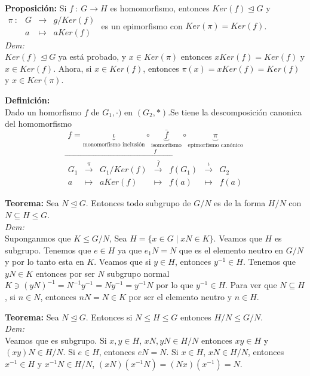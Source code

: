 \documentclass{article}
\begin{document}
\textbf{Proposición:} Si $f\::\:G\longrightarrow H$ es homomorfismo, entonces $Ker(f)\trianglelefteq G$ y $
\begin{array}{cccc}
    \pi\::&G&\longrightarrow&g/Ker(f)\\
        &a&\longmapsto&aKer(f)
\end{array}
$ es un epimorfismo con $Ker(\pi)=Ker(f)$.\\
\textit{Dem:}\\
$Ker(f)\trianglelefteq G$ ya está probado, y $x\in Ker(\pi)$ entonces $xKer(f)=Ker(f)$ y $x\in Ker(f)$. Ahora, si $x\in Ker(f)$, entonces $\pi(x)=xKer(f)=Ker(f)$ y $x \in Ker(\pi)$.

\textbf{Definición:}\\
Dado un homorfismo $f$ de $G_1,\cdot)$ en $(G_2,*)$.Se tiene la descomposición canonica del homomorfismo $$f=\underbrace{\iota}_\text{monomorfismo inclusión} \circ \underbrace{\bar{f}}_\text{isomorfismo} \circ \underbrace{\pi}_\text{epimorfismo canónico}$$
$$
\overset{f}{\overrightarrow{\begin{array}{cccccccccccc}
    G_1&\overset{\pi}{\longrightarrow}&G_1/Ker(f)&\overset{\bar{f}}{\longrightarrow}&f(G_1)&\overset{\iota}{\longrightarrow}&G_2\\
    a&\longmapsto&aKer(f)&\longmapsto&f(a)&\longmapsto&f(a)
\end{array}}}
$$

\textbf{Teorema:} Sea $N\trianglelefteq G$. Entonces todo subgrupo de $G/N$ es de la forma $H/N$ con $N\subseteq H \le G$.\\
\textit{Dem:}\\
Suponganmos que $K\le G/N$, Sea $H=\{ x\in G \mid xN\in K \}$. Veamos que $H$ es subgrupo. Tenemos que $e\in H$ ya que $e_1N=N$ que es el elemento neutro en $G/N$ y por lo tanto esta en $K$. Veamos que si $y\in H$, entonces $y^{-1}\in H$. Tenemos que $yN\in K$ entonces por ser $N$ subgrupo normal $K\ni(yN)^{-1}=N^{-1}y^{-1}=Ny^{-1}=y^{-1}N$ por lo que $y^{-1}\in H$. Para ver que $N\subseteq H$, si $n\in N$, entonces $nN=N\in K$ por ser el elemento neutro y $n\in H$.

\textbf{Teorema:} Sea $N\trianglelefteq G$. Entonces si $N\le H\le G$ entonces $H/N\le G/N$.\\
\textit{Dem:}\\
Veamos que es subgrupo. Si $x,y\in H$, $xN,yN\in H/N$ entonces $xy\in H$ y $(xy)N\in H/N$. Si $e\in H$, entonces $eN=N$. Si $x\in H$, $xN\in H/N$, entonces $x^{-1}\in H$ y $x^{-1}N\in H/N$, $(xN)(x^{-1}N)=(Nx)(x^{-1})=N$.
\end{document}
